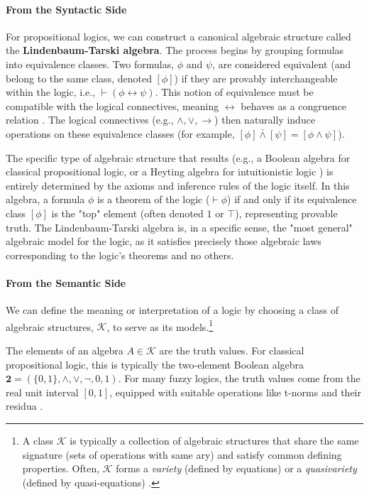 \paragraph{From the Syntactic Side} For propositional logics, we can construct a canonical algebraic structure called the \textbf{Lindenbaum-Tarski algebra}. The process begins by grouping formulas into equivalence classes. Two formulas, $\phi$ and $\psi$, are considered equivalent (and belong to the same class, denoted $[\phi]$) if they are provably interchangeable within the logic, i.e., $\vdash (\phi \leftrightarrow \psi)$. This notion of equivalence must be compatible with the logical connectives, meaning $\leftrightarrow$ behaves as a congruence relation \cite[p.~1-2]{BlokPigozzi1989}. The logical connectives (e.g., $\wedge, \lor, \rightarrow$) then naturally induce operations on these equivalence classes (for example, $[\phi] \bar{\wedge} [\psi] = [\phi \wedge \psi]$).

The specific type of algebraic structure that results (e.g., a Boolean algebra for classical propositional logic, or a Heyting algebra for intuitionistic logic \cite[Ch.~1]{ResiduatedLattices2007}) is entirely determined by the axioms and inference rules of the logic itself. In this algebra, a formula $\phi$ is a theorem of the logic ($\vdash \phi$) if and only if its equivalence class $[\phi]$ is the "top" element (often denoted $1$ or $\top$), representing provable truth. The Lindenbaum-Tarski algebra is, in a specific sense, the "most general" algebraic model for the logic, as it satisfies precisely those algebraic laws corresponding to the logic's theorems and no others.

\paragraph{From the Semantic Side} We can define the meaning or interpretation of a logic by choosing a class of algebraic structures, $\mathcal{K}$, to serve as its models.\footnote{A class $\mathcal{K}$ is typically a collection of algebraic structures that share the same signature (sets of operations with same ary) and satisfy common defining properties. Often, $\mathcal{K}$ forms a \textit{variety} (defined by equations) or a \textit{quasivariety} (defined by quasi-equations) \cite[Def.~2.2]{BlokPigozzi1989}.}

The elements of an algebra $A \in \mathcal{K}$ are the truth values. For classical propositional logic, this is typically the two-element Boolean algebra $\mathbf{2} = (\{0,1\}, \land, \lor, \neg, 0, 1)$. For many fuzzy logics, the truth values come from the real unit interval $[0,1]$, equipped with suitable operations like t-norms and their residua \cite[Ch.~2]{Hajek1998}.

